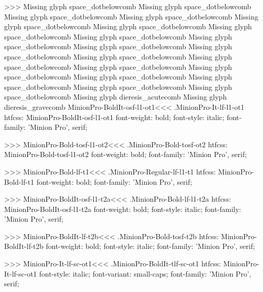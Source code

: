 {>>>
Missing glyph	space_dotbelowcomb
Missing glyph	space_dotbelowcomb
Missing glyph	space_dotbelowcomb
Missing glyph	space_dotbelowcomb
Missing glyph	space_dotbelowcomb
Missing glyph	space_dotbelowcomb
Missing glyph	space_dotbelowcomb
Missing glyph	space_dotbelowcomb
Missing glyph	space_dotbelowcomb
Missing glyph	space_dotbelowcomb
Missing glyph	space_dotbelowcomb
Missing glyph	space_dotbelowcomb
Missing glyph	space_dotbelowcomb
Missing glyph	space_dotbelowcomb
Missing glyph	space_dotbelowcomb
Missing glyph	space_dotbelowcomb
Missing glyph	space_dotbelowcomb
Missing glyph	space_dotbelowcomb
Missing glyph	space_dotbelowcomb
Missing glyph	dieresis_acutecomb
Missing glyph	dieresis_gravecomb
\<MinionPro-BoldIt-osf-l1-ot1\><<<
.MinionPro-It-lf-l1-ot1
htfcss:  MinionPro-BoldIt-osf-l1-ot1  font-weight: bold; font-style: italic; font-family: 'Minion Pro', serif;

>>>
\<MinionPro-Bold-tosf-l1-ot2\><<<
.MinionPro-Bold-tosf-ot2
htfcss:  MinionPro-Bold-tosf-l1-ot2  font-weight: bold; font-family: 'Minion Pro', serif;

>>>
\<MinionPro-Bold-lf-t1\><<<
.MinionPro-Regular-lf-l1-t1
htfcss:  MinionPro-Bold-lf-t1  font-weight: bold; font-family: 'Minion Pro', serif;

>>>
\<MinionPro-BoldIt-osf-l1-t2a\><<<
.MinionPro-Bold-lf-l1-t2a
htfcss:  MinionPro-BoldIt-osf-l1-t2a  font-weight: bold; font-style: italic; font-family: 'Minion Pro', serif;

>>>
\<MinionPro-BoldIt-lf-t2b\><<<
.MinionPro-Bold-tosf-t2b
htfcss:  MinionPro-BoldIt-lf-t2b  font-weight: bold; font-style: italic; font-family: 'Minion Pro', serif;

>>>
\<MinionPro-It-lf-sc-ot1\><<<
.MinionPro-BoldIt-tlf-sc-ot1
htfcss:  MinionPro-It-lf-sc-ot1  font-style: italic; font-variant: small-caps; font-family: 'Minion Pro', serif;

}
